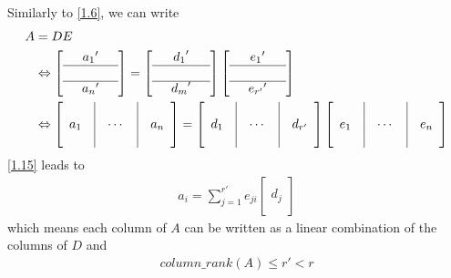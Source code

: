 \documentclass[a4paper,oneside]{book}
\numberwithin{equation}{chapter}
\begin{document}
Similarly to \eqref{1.6}, we can write
\begin{align}
\label{1.15}
A &= DE\\
& \Leftrightarrow \left[ {\begin{array}{*{20}{c}}
{}&{{a_1}'}&{}\\
\hline
{}&{}&{}\\
\hline
{}&{{a_n}'}&{}
\end{array}} \right] = \left[ {\begin{array}{*{20}{c}}
{}&{{d_1}'}&{}\\
\hline
{}&{}&{}\\
\hline
{}&{{d_m}'}&{}
\end{array}} \right]\left[ {\begin{array}{*{20}{c}}
{}&{{e_1}'}&{}\\
\hline
{}&{}&{}\\
\hline
{}&{{e_{r'}}'}&{}
\end{array}} \right]\\
& \Leftrightarrow \left[ {\begin{array}{*{20}{c}}
{}&\vline& {}&\vline& {}\\
{{a_1}}&\vline&  \cdots &\vline& {{a_n}}\\
{}&\vline& {}&\vline& {}
\end{array}} \right] = \left[ {\begin{array}{*{20}{c}}
{}&\vline& {}&\vline& {}\\
{{d_1}}&\vline&  \cdots &\vline& {{d_{r'}}}\\
{}&\vline& {}&\vline& {}
\end{array}} \right]\left[ {\begin{array}{*{20}{c}}
{}&\vline& {}&\vline& {}\\
{{e_1}}&\vline&  \cdots &\vline& {{e_n}}\\
{}&\vline& {}&\vline& {}
\end{array}} \right]
\end{align}
\eqref{1.15} leads to 
\begin{align}
{a_i} = \sum\limits_{j = 1}^{r'} {{e_{ji}}\left[ {\begin{array}{*{20}{c}}
{}\\
{{d_j}}\\
{}
\end{array}} \right]} 
\end{align}
which means each column of $A$ can be written as a linear combination of the columns of $D$ and 
\begin{align}
column\_rank\left(A\right) \le r'<r
\end{align}
\end{document}
